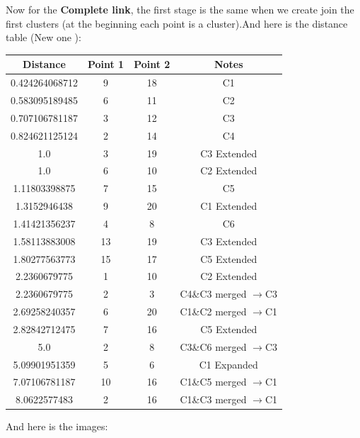 \documentclass{article}
\begin{document}
Now for the \textbf{Complete link}, the first stage is the same when we create join the first clusters (at the beginning  each point is a cluster).And here is the distance table (New one ):\\
\begin{tabular}{|c|c|c|c|}
\hline
Distance&Point 1 & Point 2&Notes\\ \hline
0.424264068712&9&18&C1\\ \hline 
 0.583095189485&6&11&C2\\ \hline 
 0.707106781187&3&12&C3\\ \hline  
 0.824621125124&2&14&C4\\ \hline 
 1.0&3&19&C3 Extended\\ \hline 
 1.0&6&10&C2 Extended\\ \hline 
 1.11803398875&7&15&C5\\ \hline 
 1.3152946438&9&20&C1 Extended\\ \hline 
 1.41421356237&4&8&C6\\ \hline 
 1.58113883008&13&19&C3 Extended\\ \hline 
 1.80277563773&15&17&C5 Extended\\ \hline 
 2.2360679775&1&10&C2 Extended\\ \hline 
 2.2360679775&2&3&C4\&C3 merged \(\rightarrow\)C3\\ \hline 
 2.69258240357&6&20&C1\&C2 merged \(\rightarrow\)C1\\ \hline 
 2.82842712475&7&16&C5 Extended\\ \hline 
 5.0&2&8&C3\&C6 merged \(\rightarrow\)C3\\ \hline 
 5.09901951359&5&6&C1 Expanded\\ \hline 
 7.07106781187&10&16&C1\&C5 merged \(\rightarrow\)C1\\ \hline 
 8.0622577483&2&16&C1\&C3 merged \(\rightarrow\)C1\\ \hline
\end{tabular}
And here is the images:
\end{document}
